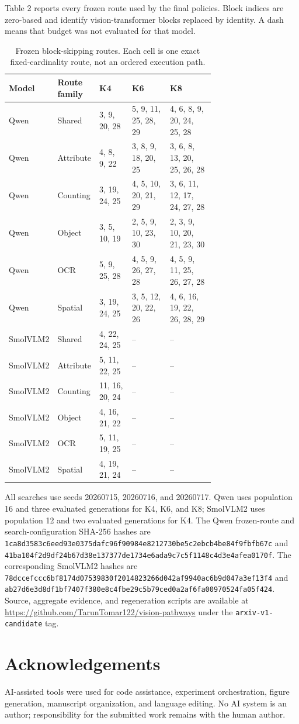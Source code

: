 \documentclass[10pt]{article}
\begin{document}
Table 2 reports every frozen route used by the final policies. Block
indices are zero-based and identify vision-transformer blocks replaced
by identity. A dash means that budget was not evaluated for that model.

\begin{table}[H]
\centering
\small
\setlength{\tabcolsep}{4pt}
\begin{tabular}{llp{0.19\linewidth}p{0.23\linewidth}p{0.28\linewidth}}
\toprule
Model & Route family & K4 & K6 & K8 \\
\midrule
Qwen & Shared & 3, 9, 20, 28 & 5, 9, 11, 25, 28, 29 & 4, 6, 8, 9, 20, 24, 25, 28 \\
Qwen & Attribute & 4, 8, 9, 22 & 3, 8, 9, 18, 20, 25 & 3, 6, 8, 13, 20, 25, 26, 28 \\
Qwen & Counting & 3, 19, 24, 25 & 4, 5, 10, 20, 21, 29 & 3, 6, 11, 12, 17, 24, 27, 28 \\
Qwen & Object & 3, 5, 10, 19 & 2, 5, 9, 10, 23, 30 & 2, 3, 9, 10, 20, 21, 23, 30 \\
Qwen & OCR & 5, 9, 25, 28 & 4, 5, 9, 26, 27, 28 & 4, 5, 9, 11, 25, 26, 27, 28 \\
Qwen & Spatial & 3, 19, 24, 25 & 3, 5, 12, 20, 22, 26 & 4, 6, 16, 19, 22, 26, 28, 29 \\
\midrule
SmolVLM2 & Shared & 4, 22, 24, 25 & -- & -- \\
SmolVLM2 & Attribute & 5, 11, 22, 25 & -- & -- \\
SmolVLM2 & Counting & 11, 16, 20, 24 & -- & -- \\
SmolVLM2 & Object & 4, 16, 21, 22 & -- & -- \\
SmolVLM2 & OCR & 5, 11, 19, 25 & -- & -- \\
SmolVLM2 & Spatial & 4, 19, 21, 24 & -- & -- \\
\bottomrule
\end{tabular}
\caption{Frozen block-skipping routes. Each cell is one exact fixed-cardinality route, not an ordered execution path.}
\label{tab:frozen-routes}
\end{table}

All searches use seeds 20260715, 20260716, and 20260717. Qwen uses
population 16 and three evaluated generations for K4, K6, and K8;
SmolVLM2 uses population 12 and two evaluated generations for K4. The
Qwen frozen-route and search-configuration SHA-256 hashes are
\nolinkurl{1ca8d3583c6eed93e0375dafc96f90984e8212730be5c2ebcb4be84f9fbfb67c}
and
\nolinkurl{41ba104f2d9df24b67d38e137377de1734e6ada9c7c5f1148c4d3e4afea0170f}.
The corresponding SmolVLM2 hashes are
\nolinkurl{78dccefccc6bf8174d07539830f2014823266d042af9940ac6b9d047a3ef13f4}
and
\nolinkurl{ab27d6e3d8df1bf7407f380e8c4fbe29c5b79ced0a2af6fa00970524fa05f424}.
Source, aggregate evidence, and regeneration scripts are available at
\url{https://github.com/TarunTomar122/vision-pathways} under the
\texttt{arxiv-v1-candidate} tag.

\section*{Acknowledgements}

AI-assisted tools were used for code assistance, experiment
orchestration, figure generation, manuscript organization, and language
editing. No AI system is an author; responsibility for the submitted
work remains with the human author.


\end{document}
